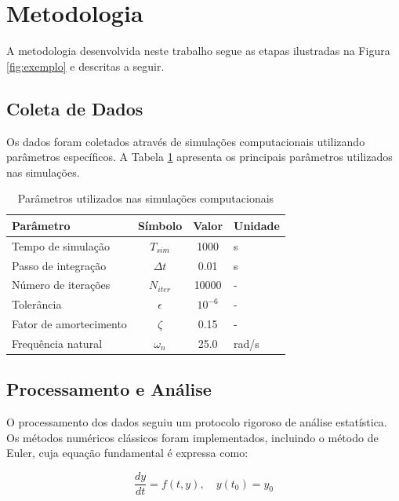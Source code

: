 \section{Metodologia}

\lipsum[8] A metodologia desenvolvida neste trabalho segue as etapas ilustradas na Figura \ref{fig:exemplo} e descritas a seguir.

\subsection{Coleta de Dados}

\lipsum[9] Os dados foram coletados através de simulações computacionais utilizando parâmetros específicos. A Tabela \ref{tab:parametros} apresenta os principais parâmetros utilizados nas simulações.

\begin{table}[H]
\centering
\caption{Parâmetros utilizados nas simulações computacionais}
\label{tab:parametros}
\begin{tabular}{@{}lccl@{}}
\toprule
\textbf{Parâmetro} & \textbf{Símbolo} & \textbf{Valor} & \textbf{Unidade} \\ \midrule
Tempo de simulação & $T_{sim}$ & 1000 & s \\
Passo de integração & $\Delta t$ & 0.01 & s \\
Número de iterações & $N_{iter}$ & 10000 & - \\
Tolerância & $\epsilon$ & $10^{-6}$ & - \\
Fator de amortecimento & $\zeta$ & 0.15 & - \\
Frequência natural & $\omega_n$ & 25.0 & rad/s \\
\bottomrule
\end{tabular}
\end{table}

\subsection{Processamento e Análise}

\lipsum[10] O processamento dos dados seguiu um protocolo rigoroso de análise estatística. Os métodos numéricos clássicos foram implementados, incluindo o método de Euler, cuja equação fundamental é expressa como:

\begin{equation}
\frac{dy}{dt} = f(t, y), \quad y(t_0) = y_0
\label{eq:euler}
\end{equation}

